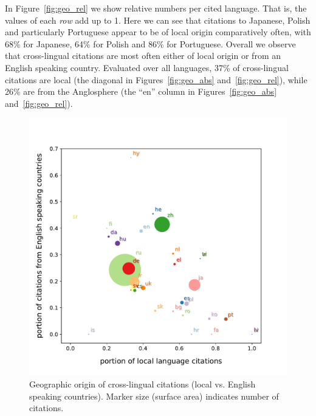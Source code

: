 In Figure~\ref{fig:geo_rel} we show relative numbers per cited language. That is, the values of each \emph{row} add up to 1. Here we can see that citations to Japanese, Polish and particularly Portuguese appear to be of local origin comparatively often, with 68\% for Japanese, 64\% for Polish and 86\% for Portuguese. Overall we observe that cross-lingual citations are most often either of local origin or from an English speaking country. Evaluated over all languages, 37\% of cross-lingual citations are local (the diagonal in Figures~\ref{fig:geo_abs} and~\ref{fig:geo_rel}), while 26\% are from the Anglosphere (the ``en'' column in Figures~\ref{fig:geo_abs} and~\ref{fig:geo_rel}).

\begin{figure}[tb]
\centering
\includegraphics[width=0.7\linewidth]{figures/ref_xling/citation_origin_local_vs_en.pdf}
\caption[Geographic origin of cross-lingual citations (local vs. English speaking countries)]{Geographic origin of cross-lingual citations (local vs. English speaking countries). Marker size (surface area) indicates number of citations.} \label{fig:geo_localvsen}
\end{figure}

